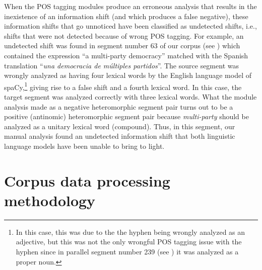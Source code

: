 \documentclass[output=paper]{langsci/langscibook}
\begin{document}
When the POS tagging modules produce an erroneous analysis that results in the inexistence of an information shift (and which produces a false negative), these information shifts that go unnoticed have been classified as undetected shifts, i.e., shifts that were not detected because of wrong POS tagging. For example, an undetected shift was found in segment number 63 of our corpus (see ) which contained the expression \enquote{a multi-party democracy} matched with the Spanish translation \enquote{\itshape una democracia de múltiples partidos}. The source segment was wrongly analyzed as having four lexical words by the English language model of spaCy,\footnote{In this case, this was due to the the hyphen being wrongly analyzed as an adjective, but this was not the only wrongful POS tagging issue with the hyphen since in parallel segment number 239 (see ) it was analyzed as a proper noun.} giving rise to a false shift and a fourth lexical word. In this case, the target segment was analyzed correctly with three lexical words. What the module analysis made as a negative heteromorphic segment pair turns out to be a positive (antinomic) heteromorphic segment pair because \textit{multi-party} should be analyzed as a unitary lexical word (compound). Thus, in this segment, our manual analysis found an undetected information shift that both linguistic language models have been unable to bring to light.

\section{Corpus data processing methodology}\label{ep:meth}
\end{document}
